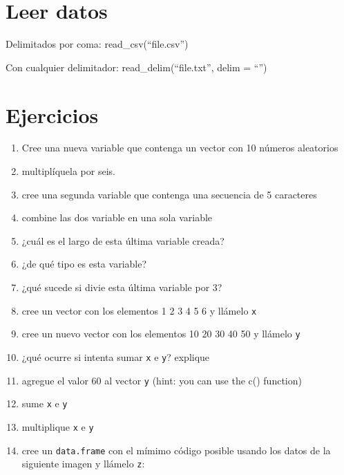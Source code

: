 \documentclass[
]{book}
\providecommand{\tightlist}{%
  \setlength{\itemsep}{0pt}\setlength{\parskip}{0pt}}
\begin{document}
\hypertarget{leer-datos}{%
\section{Leer datos}\label{leer-datos}}

Delimitados por coma: read\_csv(``file.csv'')

Con cualquier delimitador: read\_delim(``file.txt'', delim = ``\textbar{}'')

\hypertarget{ejercicios}{%
\section{Ejercicios}\label{ejercicios}}

\begin{enumerate}
\def\labelenumi{\arabic{enumi}.}
\tightlist
\item
  Cree una nueva variable que contenga un vector con 10 números aleatorios
\item
  multiplíquela por seis.
\item
  cree una segunda variable que contenga una secuencia de 5 caracteres
\item
  combine las dos variable en una sola variable
\item
  ¿cuál es el largo de esta última variable creada?
\item
  ¿de qué tipo es esta variable?
\item
  ¿qué sucede si divie esta última variable por 3?
\item
  cree un vector con los elementos 1 2 3 4 5 6 y llámelo \texttt{x}
\item
  cree un nuevo vector con los elementos 10 20 30 40 50 y llámelo \texttt{y}
\item
  ¿qué ocurre si intenta sumar \texttt{x} e \texttt{y}? explique
\item
  agregue el valor 60 al vector \texttt{y} (hint: you can use the c() function)
\item
  sume \texttt{x} e \texttt{y}
\item
  multiplique \texttt{x} e \texttt{y}
\item
  cree un \texttt{data.frame} con el mímimo código posible usando los datos de la siguiente imagen y llámelo \texttt{z}:
\end{enumerate}
\end{document}
